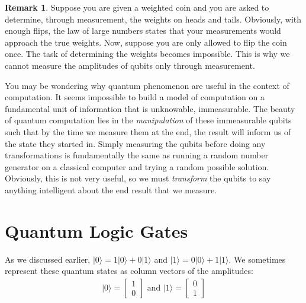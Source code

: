 \documentclass[12pt,twoside]{reedthesis}
\theoremstyle{definition}
\newtheorem{remark}[theorem]{Remark}
\newcommand{\ketz}{\ensuremath{\lvert 0\rangle}\xspace}
\newcommand{\keto}{\ensuremath{\lvert 1\rangle}\xspace}
\begin{document}
\begin{remark}
Suppose you are given a weighted coin and you are asked to determine, through measurement, the weights on heads and tails. Obviously, with enough flips, the law of large numbers states that your measurements would approach the true weights. Now, suppose you are only allowed to flip the coin once. The task of determining the weights becomes impossible. This is why we cannot measure the amplitudes of qubits only through measurement.
\end{remark}
You may be wondering why quantum phenomenon are useful in the context of computation. It seems impossible to build a model of computation on a fundamental unit of information that is unknowable, immeasurable. The beauty of quantum computation lies in the \textit{manipulation} of these immeasurable qubits such that by the time we measure them at the end, the result will inform us of the state they started in. Simply measuring the qubits before doing any transformations is fundamentally the same as  running a random number generator on a classical computer and trying a random possible solution. Obviously, this is not very useful, so we must \textit{transform} the qubits to say anything intelligent about the end result that we measure.

\section{Quantum Logic Gates}

As we discussed earlier, $\ketz = 1 \ketz + 0  \keto$ and $\keto = 0 \ketz + 1 \keto$. We sometimes represent these quantum states as column vectors of the amplitudes: 
\begin{align*}
\ketz = \begin{bmatrix}
1\\
0
\end{bmatrix}
\text{ and }
\keto = \begin{bmatrix}
0\\
1
\end{bmatrix}
\end{align*}
\end{document}
